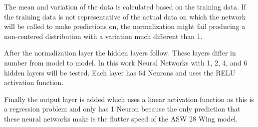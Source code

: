 The mean and variation of the data is calculated based on the training
data. If the training data is not representative of the actual data on
which the network will be called to make predictions on, the
normalization might fail producing a non-centered distribution with a
variation much different than 1.

After the normalization layer the hidden layers follow. These layers
differ in number from model to model. In this work Neural Networks with
1, 2, 4, and 6 hidden layers will be tested. Each layer has 64 Neurons
and uses the RELU activation function.

Finally the output layer is added which uses a linear activation function
as this is a regression problem and only has 1 Neuron because the only
prediction that these neural networks make is the flutter speed of the
ASW 28 Wing model.

